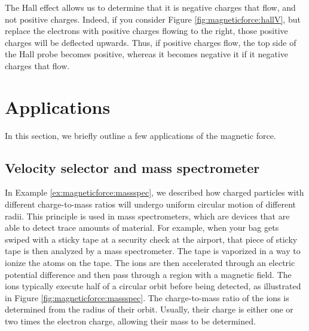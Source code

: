 The Hall effect allows us to determine that it is negative charges that flow, and not positive charges. Indeed, if you consider Figure \ref{fig:magneticforce:hallV}, but replace the electrons with positive charges flowing to the right, those positive charges will be deflected upwards. Thus, if positive charges flow, the top side of the Hall probe becomes positive, whereas it becomes negative it if it negative charges that flow. 

\section{Applications}
In this section, we briefly outline a few applications of the magnetic force.
\subsection{Velocity selector and mass spectrometer}
In Example \ref{ex:magneticforce:massspec}, we described how charged particles with different charge-to-mass ratios will undergo uniform circular motion of different radii. This principle is used in mass spectrometers, which are devices that are able to detect trace amounts of material. For example, when your bag gets swiped with a sticky tape at a security check at the airport, that piece of sticky tape is then analyzed by a mass spectrometer. The tape is vaporized in a way to ionize the atoms on the tape. The ions are then accelerated through an electric potential difference and then pass through a region with a magnetic field. The ions typically execute half of a circular orbit before being detected, as illustrated in Figure \ref{fig:magneticforce:massspec}. The charge-to-mass ratio of the ions is determined from the radius of their orbit. Usually, their charge is either one or two times the electron charge, allowing their mass to be determined. 

